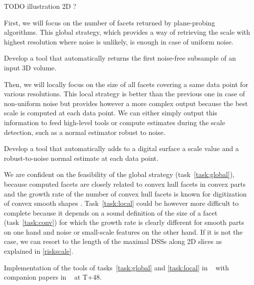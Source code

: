 TODO illustration 2D ?

First, we will focus on the number of facets returned by plane-probing algorithms.
This global strategy, which provides a way of retrieving the scale with highest resolution
where noise is unlikely, is enough in case of uniform noise. 

\begin{Task}
  \label{task:global}
  Develop a tool that automatically returns the first noise-free subsample of an input 3D volume.
\end{Task}

Then, we will locally focus on the size of all facets covering a same data point for various resolutions. 
This local strategy is better than the previous one in case of non-uniform noise but provides however
a more complex output because the best scale is computed at each data point.
We can either simply output this information to feed high-level tools or compute estimates during
the scale detection, such as a normal estimator robust to noise.  

\begin{Task}
  \label{task:local}
  Develop a tool that automatically adds to a digital surface a scale value and
  a robust-to-noise normal estimate at each data point. 
\end{Task}

\Risks
We are confident on the feasibility of the global strategy (task~\ref{task:global}),
because computed facets are closely related to convex hull facets in convex parts
and the growth rate of the number of convex hull facets is known for digitization
of convex smooth shapes \cite{Barany1998}. 
Task~\ref{task:local} could be however more difficult to complete
because it depends on a sound definition of the size of a facet (task~\ref{task:conv})
for which the growth rate is clearly different for smooth parts on one hand
and noise or small-scale features on the other hand. If it is not the case, we can
resort to the length of the maximal DSSs along 2D slices as explained in \ref{riskscale}.

\Success
  Implementation of the tools of tasks~\ref{task:global} and \ref{task:local}
    in \DGtalTools~ with companion papers in \IPOL~ at T+48.

    


